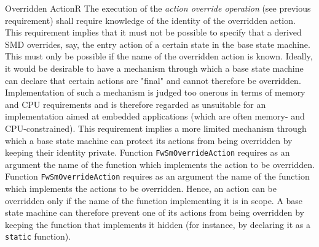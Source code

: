 \documentclass[a4paper,10pt]{article}
\newenvironment{fw_req_note}[7]
{\addtocounter{subsubsection}{1}
	\hspace{0.2cm}\textbf{FW-\arabic{section}.\arabic{subsection}.\arabic{subsubsection}/#2
	\hspace{0.8cm} #1}
	\vspace{-10pt}
\begin{longtable}{p{2.7cm}P{8.5cm}}
\hline
\textsc{Requirement} & #3 \\
\textsc{Note} & #4 \\
\textsc{Justification} & #5 \\
\textsc{Implementation} & #6  \\ 
\textsc{Verification} & #7  \\
\hline
}
{\end{longtable}}
\begin{document}
\begin{fw_req_note}{Overridden Action}{R}
{The execution of the \emph{action override operation} (see previous
requirement) shall require knowledge of the identity of the overridden action.}
{This requirement implies that it must not be possible to specify that a derived 
SMD overrides, say, the entry action of a certain state in the base state machine. 
This must only be possible if the name of the overridden action is known.}
{Ideally, it would be desirable to have a mechanism through which a base 
state machine can declare that certain actions are "final" and cannot therefore be overridden. 
Implementation of such a mechanism is judged too onerous in terms of memory and CPU requirements 
and is therefore regarded as unsuitable for an implementation aimed at embedded applications 
(which are often memory- and CPU-constrained). 
This requirement implies a more limited mechanism through which a base state machine can protect 
its actions from being overridden by keeping their identity private.}
{Function \texttt{FwSmOverrideAction} requires as an argument the name 
of the function which implements the action to be overridden.} 
{Function \texttt{FwSmOverrideAction} requires as an argument the name of 
the function which implements the actions to be overridden. 
Hence, an action can be overridden only if the name of the function implementing it is in scope. 
A base state machine can therefore prevent one of its actions from being overridden by keeping 
the function that implements it hidden (for instance, by declaring it as a \texttt{static} 
function).}
\end{fw_req_note}
\end{document}
